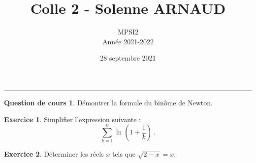 \documentclass[a4paper, 11pt,openany]{article}%
\title{Colle 2 - Solenne ARNAUD}
\author{MPSI2\\
Année 2021-2022}
\date{28 septembre 2021}
\theoremstyle{plain}
\theoremstyle{definition}
\newtheorem{cours}{Question de cours}
\newtheorem{exo}{Exercice}
\newtheorem{sol}{Solution de l'exercice}
\theoremstyle{remark}
\begin{document}
   \maketitle
      \rule{\linewidth}{0.5mm}

\begin{cours}
Démontrer la formule du binôme de Newton.
\end{cours}

\begin{exo}
	Simplifier l'expression suivante :
	\[
		\sum_{k=1}^n \ln\left(1+ \frac{1}{k}\right) \ .
	\]
\end{exo}

\begin{exo}
Déterminer les réels $x$ tels que $\sqrt{2-x} = x$.
\end{exo}




\end{document}
